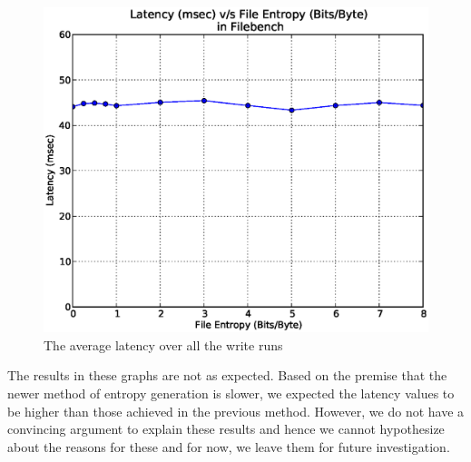 \begin{figure}[H]
\begin{center}
\includegraphics[scale=.55]{../results/set2/write_latency_avg_2.eps}
\caption{The average latency over all the write runs}
\label{fig:wlavg2}
\end{center}
\end{figure}
The results in these graphs are not as expected. Based on the premise that the newer method of entropy generation is slower, we expected the latency values to be higher than those achieved in the previous method. However, we do not have a convincing argument to explain these results and hence we cannot hypothesize about the reasons for these and for now, we leave them for future investigation.

